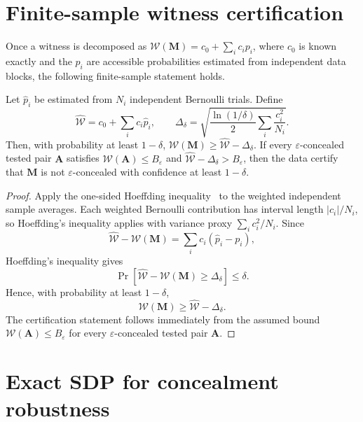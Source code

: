 \documentclass[
aps,pra,twocolumn,10pt,
superscriptaddress,longbibliography,floatfix
]{revtex4-2}
\begin{document}
\section{Finite-sample witness certification}
\label{app:finite_sample}

Once a witness is decomposed as $\mathcal W(\mathbf M)=c_0+\sum_i c_ip_i$, where $c_0$ is known exactly and the $p_i$ are accessible probabilities estimated from independent data blocks, the following finite-sample statement holds.

Let $\widehat p_i$ be estimated from $N_i$ independent Bernoulli trials. Define
\[
\widehat{\mathcal W}=c_0+\sum_i c_i\widehat p_i,\qquad
\Delta_\delta=\sqrt{\frac{\ln(1/\delta)}{2}\sum_i\frac{c_i^2}{N_i}}.
\]
Then, with probability at least $1-\delta$, $\mathcal W(\mathbf M)\ge\widehat{\mathcal W}-\Delta_\delta$. If every $\varepsilon$-concealed tested pair $\mathbf A$ satisfies $\mathcal W(\mathbf A)\le B_\varepsilon$ and $\widehat{\mathcal W}-\Delta_\delta>B_\varepsilon$, then the data certify that $\mathbf M$ is not $\varepsilon$-concealed with confidence at least $1-\delta$.

\begin{proof}
Apply the one-sided Hoeffding inequality~\cite{Hoeffding1963}
to the weighted independent sample averages. Each weighted Bernoulli
contribution has interval length $|c_i|/N_i$, so Hoeffding's inequality
applies with variance proxy $\sum_i c_i^2/N_i$. Since
\[
\widehat{\mathcal W}-\mathcal W(\mathbf M)
=
\sum_i c_i(\widehat p_i-p_i),
\]
Hoeffding's inequality gives
\[
\Pr\!\left[
\widehat{\mathcal W}-\mathcal W(\mathbf M)\ge\Delta_\delta
\right]
\le\delta.
\]
Hence, with probability at least $1-\delta$,
\[
\mathcal W(\mathbf M)\ge\widehat{\mathcal W}-\Delta_\delta.
\]
The certification statement follows immediately from the assumed
bound $\mathcal W(\mathbf A)\le B_\varepsilon$ for every
$\varepsilon$-concealed tested pair $\mathbf A$.
\end{proof}

\section{Exact SDP for concealment robustness}
\label{app:robustness_sdp}
\end{document}
